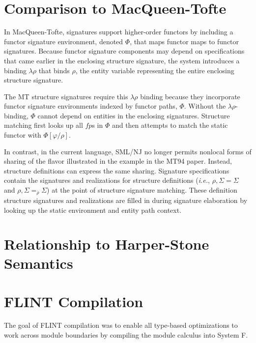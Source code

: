 \documentclass[9pt]{sigplanconf}
\begin{document}
{




 





\section{Comparison to MacQueen-Tofte}
In MacQueen-Tofte, signatures support higher-order functors by including a functor signature environment, denoted $\Phi$, that maps functor maps to functor signatures. Because functor signature components may depend on specifications that came earlier in the enclosing structure signature, the system introduces a binding $\lambda\rho$ that binds $\rho$, the entity variable representing the entire enclosing structure signature. 

The MT structure signatures require this $\lambda\rho$ binding because they incorporate functor signature environments indexed by functor paths, $\Phi$. Without the $\lambda\rho$-binding, $\Phi$ cannot depend on entities in the enclosing signatures. Structure matching first looks up all $fp$s in $\Phi$ and then attempts to match the static functor with $\Phi[\varphi/\rho]$.

In contrast, in the current language, SML/NJ no longer permits nonlocal forms of sharing of the flavor illustrated in the example in the MT94 paper. Instead, structure definitions can express the same sharing. Signature specifications contain the signatures and realizations for structure definitions ({\it i.e.}, $\rho,\Sigma=\Sigma$ and $\rho,\Sigma=_{\overline{\rho}} \Sigma$) at the point of structure signature matching. These definition structure signatures and realizations are filled in during signature elaboration by looking up the static environment and entity path context.  



\section{Relationship to Harper-Stone Semantics}



\section{FLINT Compilation}
The goal of FLINT compilation was to enable all type-based optimizations to work across module boundaries by compiling the module calculus into System F. 



}


\end{document}
